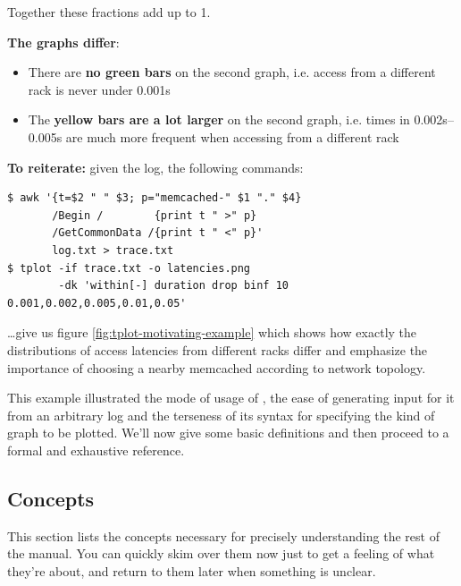 \documentclass{article}
\begin{document}
Together these fractions add up to 1.

\textbf{The graphs differ}:
\begin{itemize}
\item There are \textbf{no green bars} on the second graph, i.e. access from a different rack is never under 0.001s
\item The \textbf{yellow bars are a lot larger} on the second graph, i.e. times in 0.002s--0.005s are much more frequent when accessing from a different rack
\end{itemize}

\textbf{To reiterate:} given the log, the following commands:

\begin{verbatim}
$ awk '{t=$2 " " $3; p="memcached-" $1 "." $4}
       /Begin /        {print t " >" p} 
       /GetCommonData /{print t " <" p}'
       log.txt > trace.txt
$ tplot -if trace.txt -o latencies.png
        -dk 'within[-] duration drop binf 10 0.001,0.002,0.005,0.01,0.05'
\end{verbatim}

\ldots give us figure \ref{fig:tplot-motivating-example} which shows how exactly the distributions of access latencies from different racks differ and emphasize the importance of choosing a nearby memcached according to network topology.

This example illustrated the mode of usage of \timeplot{}, the ease of generating input for it from an arbitrary log and the terseness of its syntax for specifying the kind of graph to be plotted. We'll now give some basic definitions and then proceed to a formal and exhaustive reference.

\subsection{Concepts}
\label{sec:tplot-concepts}

This section lists the concepts necessary for precisely understanding the rest of the manual. You can quickly skim over them now just to get a feeling of what they're about, and return to them later when something is unclear.
\end{document}

